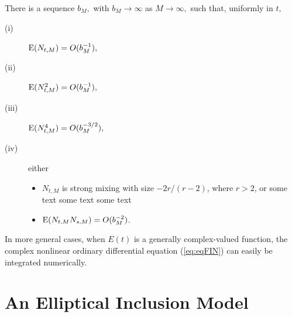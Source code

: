 \documentclass[fleqn]{jleo}
\begin{document}
\begin{lemma}

There is a sequence $b_{M},$ with $%
b_{M}\rightarrow \infty $ as $M\rightarrow \infty ,$ such that, uniformly in
$t,$

\begin{description}
\item[{\rm (i)}\phantom{ii}] $\hbox{\rm E}( N_{t,M}) =O(b_{M}^{-1}),$

\item[{\rm (ii)}\phantom{i}] $\hbox{\rm E}( N_{t,M}^{2}) =O(b_{M}^{-1}),$

\item[{\rm (iii)}] $\hbox{\rm E}( N_{t,M}^{4}) =O(b_{M}^{-3/2}),$

\item[{\rm (iv)}\phantom{\hspace*{.5pt}}] either
\begin{itemize}
\item[{\rm (a)}] $N_{t,M}$ is strong mixing with size $-2r/(r-2)$, where $r>2$, or some text some text some text 

\item[{\rm (b)}] $\hbox{\rm E}( N_{t,M}N_{s,M}) =O(b_{M}^{-2})$.
\end{itemize}
\end{description}
\end{lemma}
In more general cases, when $E(t)$ is a generally complex-valued
function, the complex nonlinear ordinary differential
equation (\ref{eq:eqFIN}) can easily be integrated numerically.


\section{An Elliptical Inclusion Model}
\end{document}
